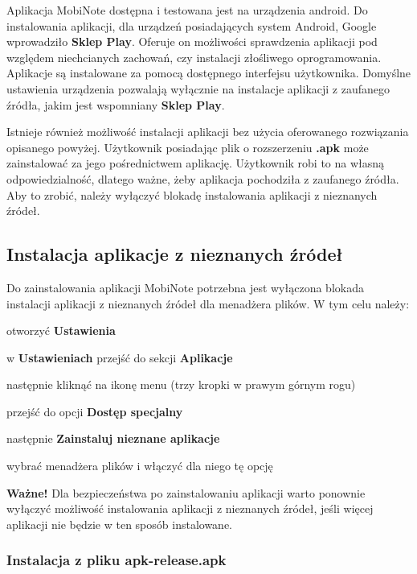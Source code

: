 \documentclass[shortabstract]{iithesis}
\begin{document}
Aplikacja MobiNote dostępna i testowana jest na urządzenia android. Do instalowania aplikacji, dla urządzeń posiadających system Android, Google wprowadziło \textbf{Sklep Play}. Oferuje on możliwości sprawdzenia aplikacji pod względem niechcianych zachowań, czy instalacji złośliwego oprogramowania. Aplikacje są instalowane za pomocą dostępnego interfejsu użytkownika. Domyślne ustawienia urządzenia pozwalają wyłącznie na instalacje aplikacji z zaufanego źródła, jakim jest wspomniany \textbf{Sklep Play}.

Istnieje również możliwość instalacji aplikacji bez użycia oferowanego rozwiązania opisanego powyżej. Użytkownik posiadając plik o rozszerzeniu \textbf{.apk} może zainstalować za jego pośrednictwem aplikację. Użytkownik robi to na własną odpowiedzialność, dlatego ważne, żeby aplikacja pochodziła z zaufanego źródła. Aby to zrobić, należy wyłączyć blokadę instalowania aplikacji z nieznanych źródeł.

\subsection{Instalacja aplikacje z nieznanych źródeł}
Do zainstalowania aplikacji MobiNote potrzebna jest wyłączona blokada instalacji aplikacji z nieznanych źródeł dla menadżera plików.
W tym celu należy:
\begin{compactitem}
    \item otworzyć \textbf{Ustawienia}
    \item w \textbf{Ustawieniach} przejść do sekcji \textbf{Aplikacje}
    \item następnie kliknąć na ikonę menu (trzy kropki w prawym górnym rogu)
    \item przejść do opcji \textbf{Dostęp specjalny}
    \item następnie \textbf{Zainstaluj nieznane aplikacje}
    \item wybrać menadżera plików i włączyć dla niego tę opcję
\end{compactitem}

\textbf{Ważne!} Dla bezpieczeństwa po zainstalowaniu aplikacji warto ponownie wyłączyć możliwość instalowania aplikacji z nieznanych źródeł, jeśli więcej aplikacji nie będzie w ten sposób instalowane.

\subsubsection{Instalacja z pliku apk-release.apk}
\end{document}

